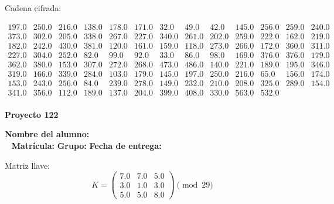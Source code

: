 \documentclass[12pt]{article}
\begin{document}
Cadena cifrada:
\begin{center}
$\begin{array}{lllllllllllll}
197.0 & 250.0 & 216.0 & 138.0 & 178.0 & 171.0 & 32.0 & 49.0 & 42.0 & 145.0 & 256.0 & 259.0 & 240.0\\
373.0 & 302.0 & 205.0 & 338.0 & 267.0 & 227.0 & 340.0 & 261.0 & 202.0 & 259.0 & 222.0 & 162.0 & 219.0\\
182.0 & 242.0 & 430.0 & 381.0 & 120.0 & 161.0 & 159.0 & 118.0 & 273.0 & 266.0 & 172.0 & 360.0 & 311.0\\
227.0 & 304.0 & 252.0 & 82.0 & 99.0 & 92.0 & 33.0 & 86.0 & 98.0 & 169.0 & 376.0 & 376.0 & 179.0\\
362.0 & 380.0 & 153.0 & 307.0 & 272.0 & 268.0 & 473.0 & 486.0 & 140.0 & 221.0 & 189.0 & 195.0 & 346.0\\
319.0 & 166.0 & 339.0 & 284.0 & 103.0 & 179.0 & 145.0 & 197.0 & 250.0 & 216.0 & 65.0 & 156.0 & 174.0\\
153.0 & 243.0 & 256.0 & 84.0 & 239.0 & 278.0 & 149.0 & 232.0 & 210.0 & 208.0 & 325.0 & 289.0 & 154.0\\
341.0 & 356.0 & 112.0 & 189.0 & 137.0 & 204.0 & 399.0 & 408.0 & 330.0 & 563.0 & 532.0\\
\end{array}$
\end{center}

\newpage


\textbf{Proyecto 122}

\textbf{Nombre del alumno:} \underline{\hspace{13cm}}\\\
\vspace{1cm}
\textbf{Matrícula:} \underline{\hspace{4cm}} \hspace{1cm}
\textbf{Grupo:} \underline{\hspace{2cm}}
\textbf{Fecha de entrega:} \underline{\hspace{2cm}}

\medskip

Matriz llave:
\[
K = \begin{pmatrix}
7.0 & 7.0 & 5.0\\
3.0 & 1.0 & 3.0\\
5.0 & 5.0 & 8.0
\end{pmatrix} \pmod{29}
\]
\end{document}

